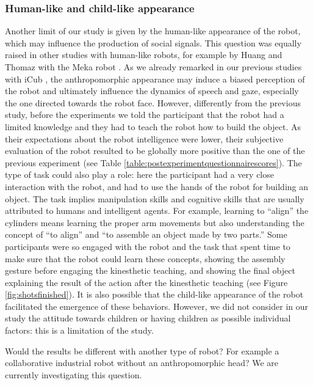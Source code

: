 \documentclass[twocolumn]{svjour3}          %
\begin{document}
\subsubsection{Human-like and child-like appearance}

Another limit of our study is given by the human-like appearance of the robot, which may influence the production of social signals. This question was equally raised in other studies with human-like robots, for example by Huang and Thomaz with the Meka robot \cite{Huang2011}.
As we already remarked in our previous studies with iCub \cite{ivaldi2014frontiers}, the anthropomorphic appearance may induce a biased perception of the robot and ultimately influence the dynamics of speech and gaze, especially the one directed towards the robot face. 
However, differently from the previous study, before the experiments we told the participant that the robot had a limited knowledge and they had to teach the robot how to build the object. As their expectations about the robot intelligence were lower, their subjective evaluation of the robot resulted to be globally more positive than the one of the previous experiment (see Table \ref{table:postexperimentquestionnairescores}). 
The type of task could also play a role: here the participant had a very close interaction with the robot, and had to use the hands of the robot for building an object. The task implies manipulation skills and cognitive skills that are usually attributed to humans and intelligent agents. For example, learning to ``align'' the cylinders means learning the proper arm movements but also understanding the concept of ``to align'' and ``to assemble an object made by two parts.'' Some participants were so engaged with the robot and the task that spent time to make sure that the robot could learn these concepts, showing the assembly gesture before engaging the kinesthetic teaching, and showing the final object explaining the result of the action after the kinesthetic teaching (see Figure \ref{fig:shotsfinished}).
It is also possible that the child-like appearance of the robot facilitated the emergence of these behaviors. However, we did not consider in our study the attitude towards children or having children as possible individual factors: this is a limitation of the study.

Would the results be different with another type of robot? For example a collaborative industrial robot without an anthropomorphic head? We are currently investigating this question.
\end{document}
